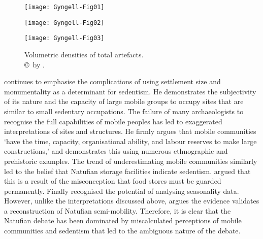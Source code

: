 \begin{wrapfigure}{O}[3cm]{0.5\textwidth} 
\texttt{[image: Gyngell-Fig01]}
\caption{Plan of Wadi Hammeh 27, Phase 1.
        {\normalfont\scriptsize \\ \copyright\ by 
	 \textcite{Hardy-Smith_2004}.}}
\label{fig:Gyngell-Fig01}
\vspace*{.9\baselineskip}
\texttt{[image: Gyngell-Fig02]}
\caption{Volumetric distribution of flaked stone (flint) artefacts.
        {\normalfont\scriptsize \\ \copyright\ by 
 \textcite{Hardy-Smith_2004}.}}
\label{fig:Gyngell-Fig02}
\vspace*{.9\baselineskip}
\texttt{[image: Gyngell-Fig03]}
\caption{Volumetric densities of total artefacts.
        {\normalfont\scriptsize \\ \copyright\ by 
 \textcite{Hardy-Smith_2004}.
                  }}
\label{fig:Gyngell-Fig03}
\end{wrapfigure}
\textcite[17--29]{Edwards_1989} continues to emphasise the complications of using settlement size and monumentality as a determinant for sedentism. 
He demonstrates the subjectivity of its nature and the capacity of large mobile groups to occupy sites that are similar to small sedentary occupations. 
The failure of many archaeologists to recognise the full capabilities of mobile peoples has led to exaggerated interpretations of sites and structures.
He firmly argues that mobile communities ‘have the time, capacity, organisational ability, and labour reserves to make large constructions,’ and demonstrates this using numerous ethnographic and prehistoric examples. 
The trend of underestimating mobile communities similarly led to the belief that Natufian storage facilities indicate sedentism.
\citeauthor{Edwards_1989} 
argued that this is a result of the misconception that food stores must be guarded permanently. 
Finally 
\citeauthor{Edwards_1989}
recognised the potential of analysing seasonality data. 
However, unlike the interpretations discussed above, 
\citeauthor{Edwards_1989}
argues the evidence validates a reconstruction of Natufian semi-mobility. Therefore, it is clear that the Natufian debate has been dominated by miscalculated perceptions of mobile communities and sedentism that led to the ambiguous nature of the debate.


